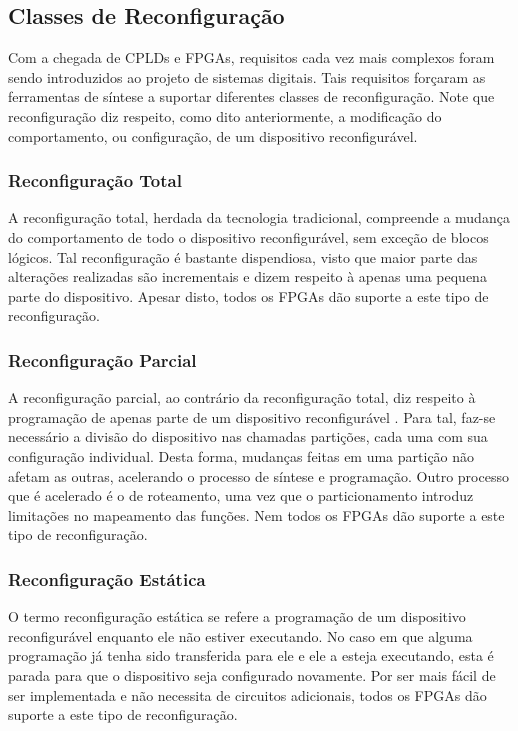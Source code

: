 \documentclass[11pt,a4paper,oneside]{book}
\begin{document}
\subsection{Classes de Reconfigura\c{c}\~ao}
Com a chegada de CPLDs e FPGAs, requisitos cada vez mais complexos foram sendo introduzidos ao projeto de sistemas digitais.
Tais requisitos for\c{c}aram as ferramentas de s\'i­ntese a suportar diferentes classes de reconfigura\c{c}\~ao.
Note que reconfigura\c{c}\~ao diz respeito, como dito anteriormente, a modifica\c{c}\~ao do comportamento, ou configura\c{c}\~ao, de um dispositivo reconfigur\'avel.

\subsubsection{Reconfigura\c{c}\~ao Total}
A reconfigura\c{c}\~ao total, herdada da tecnologia tradicional, compreende a mudan\c{c}a do comportamento de todo o dispositivo reconfigur\'avel, sem exce\c{c}\~ao de blocos l\'ogicos.
Tal reconfigura\c{c}\~ao \'e bastante dispendiosa, visto que maior parte das alterações realizadas são incrementais e dizem respeito \`a apenas uma pequena parte do dispositivo.
Apesar disto, todos os FPGAs d\~ao suporte a este tipo de reconfigura\c{c}\~ao.

\subsubsection{Reconfigura\c{c}\~ao Parcial}
A reconfigura\c{c}\~ao parcial, ao contr\'ario da reconfigura\c{c}\~ao total, diz respeito \`a programa\c{c}\~ao de apenas parte de um dispositivo reconfigur\'avel \cite{Hauck2007}.
Para tal, faz-se necess\'ario a divis\~ao do dispositivo nas chamadas parti\c{c}\~oes, cada uma com sua configura\c{c}\~ao individual.
Desta forma, mudan\c{c}as feitas em uma parti\c{c}\~ao n\~ao afetam as outras, acelerando o processo de s\'i­ntese e programa\c{c}\~ao.
Outro processo que \'e acelerado \'e o de roteamento, uma vez que o particionamento introduz limita\c{c}\~oes no mapeamento das fun\c{c}\~oes.
Nem todos os FPGAs d\~ao suporte a este tipo de reconfigura\c{c}\~ao.


\subsubsection{Reconfigura\c{c}\~ao Est\'atica}
O termo reconfigura\c{c}\~ao est\'atica se refere a programa\c{c}\~ao de um dispositivo reconfigur\'avel enquanto ele n\~ao estiver executando.
No caso em que alguma programa\c{c}\~ao j\'a tenha sido transferida para ele e ele a esteja executando, esta \'e parada para que o dispositivo seja configurado novamente.
Por ser mais f\'acil de ser implementada e n\~ao necessita de circuitos adicionais, todos os FPGAs d\~ao suporte a este tipo de reconfigura\c{c}\~ao.
\end{document}
